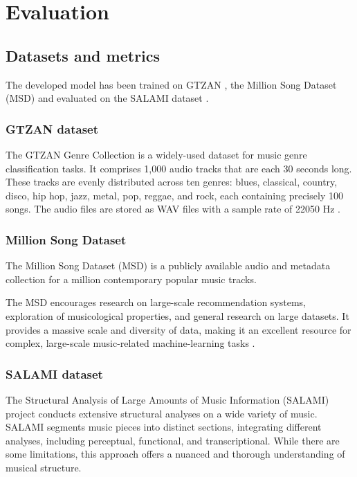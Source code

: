 \chapter{Evaluation}

\section{Datasets and metrics}
\label{section:Datasets and metrics}

The developed model has been trained on GTZAN \cite{GTZAN}, the Million Song Dataset (MSD) \cite{MSD} and evaluated on the SALAMI dataset \cite{Smith2011DESIGNANNOTATIONS}. 

\subsection{GTZAN dataset}
The GTZAN Genre Collection is a widely-used dataset for music genre classification tasks. It comprises 1,000 audio tracks that are each 30 seconds long. These tracks are evenly distributed across ten genres: blues, classical, country, disco, hip hop, jazz, metal, pop, reggae, and rock, each containing precisely 100 songs. The audio files are stored as WAV files with a sample rate of 22050 Hz \cite{GTZAN}.

\subsection{Million Song Dataset}
The Million Song Dataset (MSD) is a publicly available audio and metadata collection for a million contemporary popular music tracks.

The MSD encourages research on large-scale recommendation systems, exploration of musicological properties, and general research on large datasets. It provides a massive scale and diversity of data, making it an excellent resource for complex, large-scale music-related machine-learning tasks \cite{MSD}.

\subsection{SALAMI dataset}

The Structural Analysis of Large Amounts of Music Information (SALAMI) project conducts extensive structural analyses on a wide variety of music. SALAMI segments music pieces into distinct sections, integrating different analyses, including perceptual, functional, and transcriptional. While there are some limitations, this approach offers a nuanced and thorough understanding of musical structure.

